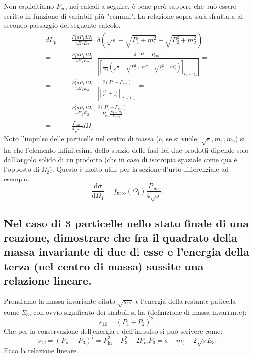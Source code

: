 Non esplicitiamo $P_{\text{cm}}$ nei calcoli a seguire, è bene però sappere che può essere scritto in funzione di variabili più "comuni". La relazione sopra sarà sfruttata al secondo passaggio del seguente calcolo.
\begin{align*}
	dL_p =& \frac{P_1^2 dP_1 d \Omega_1}{4E_1E_2} \cdot \delta\left( \sqrt{s} - \sqrt{P_1^2 + m_1^2} - \sqrt{P_2^2 + m_2^2}  \right) \\
	=& \frac{P_1^2 dP_1 d \Omega_1}{4E_1E_2} \cdot 
	\frac{\delta\left(P_1-P_{\text{cm}}\right)}{\left|\left[\frac{\mbox{d}}{\mbox{d}P_1}\left(\sqrt{s}-\sqrt{P_1^2+m_1^2}-\sqrt{P_1^2+m_2^2}\right)\right]_{P_1=P_{\text{cm}}}\right|} = \\
	=& \frac{P_1^2 dP_1 d \Omega_1}{4E_1E_2} \cdot \frac{ \delta \left( P_1-P_{\text{cm}} \right) }{ \left| \left[ \frac{P_1}{E_1}+\frac{P_1}{E_2} \right]_{P_1=P_{\text{cm}}} \right|}=\\
	=& \frac{P_1^2 dP_1 d \Omega_1}{4E_1E_2} \cdot \frac{\delta\left(P_1-P_{\text{cm}}\right)}{P_{\text{cm}} \frac{E_1 + E_2}{E_1E_2}} = \\
	=& \frac{P_{\text{cm}} }{4\sqrt{s}} d\Omega_{1}
\end{align*}
Noto l'impulso delle particelle nel centro di massa (o, se si vuole, $\sqrt{s}, m_1, m_2$) si ha che l'elemento infinitesimo dello spazio delle fasi dei due prodotti dipende solo dall'angolo solido di un prodotto (che in caso di isotropia spaziale come qua è l'opposto di $\Omega_2$). Questo è molto utile per la sezione d'urto differenziale ad esempio.
\[
	\frac{\mbox{d} \sigma}{\mbox{d} \Omega_1} = f_{\text{urto}}\left( \Omega_1 \right) \frac{P_{\text{cm}}}{4\sqrt{s} }
.\] 

\subsection[\hspace{2mm} Relazione lineare tra $s_{12}$ e $E_3$ nel centro di massa nel caso di 3 particelle finali]{Nel caso di 3 particelle nello stato finale di una reazione, dimostrare che fra il quadrato della massa invariante di due di esse e l'energia della terza (nel centro di massa) sussite una relazione lineare.}
Prendiamo la massa invariante citata $\sqrt{s_{12}}$ e l'energia della restante paticella come $E_3$, con ovvio significato dei simboli si ha (definizione di massa invariante):
\[
	s_{12} = \left( P_1 + P_2 \right)^2
.\] 
Che per la conservazione dell'energia e dell'impulso si può scrivere come:
\[
	s_{12} = \left( P_{\text{in}} - P_3 \right)^2 = P_{\text{in}}^2 + P_3^2 - 2 P_{\text{in}}P_3 =s + m_3^2 - 2 \sqrt{s}E_3 
.\] 
Ecco la relazione lineare.


